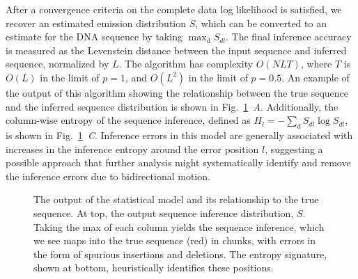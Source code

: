 \documentclass{biophys_letter}
\begin{document}
After a convergence criteria on the complete data log likelihood is satisfied, we recover an estimated emission distribution $S$, which can be converted to an estimate for the DNA sequence by taking $\mathrm{\max_{d}} {S_{dl}}$.
The final inference accuracy is measured as the Levenstein distance between the input sequence and inferred sequence, normalized by $L$.
The algorithm has complexity $O(NLT)$, where $T$ is $O(L)$ in the limit of $p=1$, and $O(L^2)$ in the limit of $p=0.5$.
An example of the output of this algorithm showing the relationship between the true sequence and the inferred sequence distribution is shown in Fig.~\ref{fig:inference_output}\emph{~A}.
Additionally, the column-wise entropy of the sequence inference, defined as $H_{l}=-\sum_{d}S_{dl}\log{S_{dl}}$, is shown in Fig.~\ref{fig:inference_output}\emph{~C}.
Inference errors in this model are generally associated with increases in the inference entropy around the error position $l$, suggesting a possible approach that further analysis might systematically identify and remove the inference errors due to bidirectional motion.

\begin{figure}
  \caption{The output of the statistical model and its relationship to the true sequence. At top, the output sequence inference distribution, $S$. Taking the max of each column yields the sequence inference, which we see maps into the true sequence (red) in chunks, with errors in the form of spurious insertions and deletions. The entropy signature, shown at bottom, heuristically identifies these positions.}
\label{fig:inference_output}
\end{figure}
\end{document}
